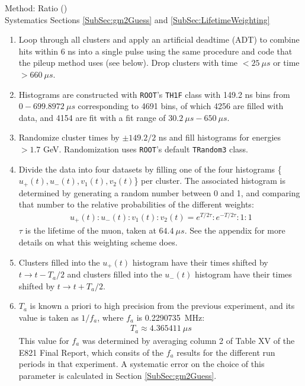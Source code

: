 	Method: Ratio () \\
	\noindent Systematics Sections \ref{SubSec:gm2Guess} and \ref{SubSec:LifetimeWeighting}

	\begin{enumerate}
		\item{Loop through all clusters and apply an artificial deadtime (ADT) to combine hits within 6 ns into a single pulse using the same procedure and code that the pileup method uses (see below). Drop clusters with time $< \SI{25}{\mu s}$ or time $> \SI{660}{\mu s}$.}
		\item{Histograms are constructed with \texttt{ROOT}'s \texttt{TH1F} class with 149.2 ns bins from $0 - \SI{699.8972}{\mu s}$ corresponding to 4691 bins, of which 4256 are filled with data, and 4154 are fit with a fit range of $\SI{30.2}{\mu s} - \SI{650}{\mu s}$.}
		\item{Randomize cluster times by $\pm 149.2/2$ ns and fill histograms for energies $> 1.7$ GeV. Randomization uses \texttt{ROOT}'s default \texttt{TRandom3} class.}
		\item{Divide the data into four datasets by filling one of the four histograms \{$u_{+}(t), u_{-}(t), v_{1}(t), v_{2}(t)$\} per cluster. The associated histogram is determined by generating a random number between 0 and 1, and comparing that number to the relative probabilities of the different weights:
			\begin{align}
				u_{+}(t) : u_{-}(t) : v_{1}(t) : v_{2}(t) = e^{T/2\tau} : e^{-T/2\tau} : 1 : 1
			\end{align}
		$\tau$ is the lifetime of the muon, taken at $\SI{64.4}{\mu s}$. See the appendix for more details on what this weighting scheme does.}
		\item{Clusters filled into the $u_{+}(t)$ histogram have their times shifted by $t \rightarrow t - T_{a}/2$ and clusters filled into the $u_{-}(t)$ histogram have their times shifted by $t \rightarrow t + T_{a}/2$.}
		\item{$T_{a}$ is known a priori to high precision from the previous experiment, and its value is taken as $1/f_{a}$, where $f_{a}$ is \SI{0.2290735}{MHz}:
			\begin{align}
				T_{a} \approx \SI{4.365411}{\mu s}
			\label{eq:Ta}
			\end{align}
		This value for $f_{a}$ was determined by averaging column 2 of Table XV of the E821 Final Report, which consits of the $f_{a}$ results for the different run periods in that experiment. A systematic error on the choice of this parameter is calculated in Section \ref{SubSec:gm2Guess}.}
	\end{enumerate}

